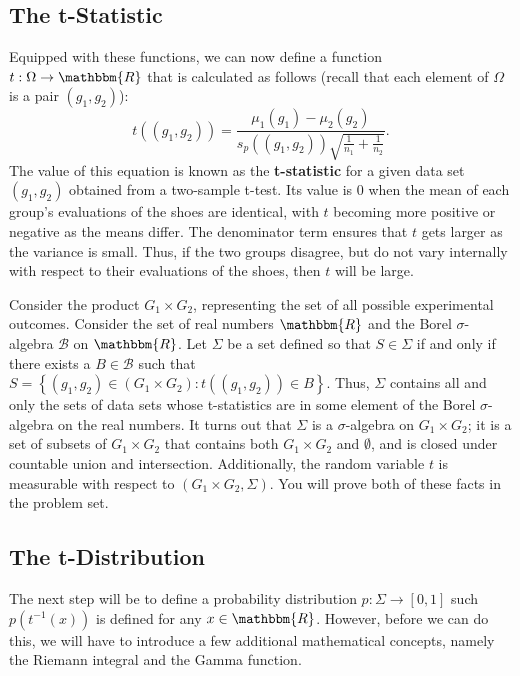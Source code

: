 \documentclass[11pt]{article}
\theoremstyle{definition}
\theoremstyle{remark}
\begin{document}
\subsection{The t-Statistic}\label{subsec:tstat}
Equipped with these functions, we can now define a function $t:\Omega\rightarrow\mathbbm{R}$ that is calculated as follows (recall that each element of $\Omega$ is a pair $(g_{1},g_{2})$): 
$$t((g_{1},g_{2}))=\frac{\mu_{1}(g_{1})-\mu_{2}(g_{2})}{s_{p}((g_{1},g_{2}))\sqrt{\frac{1}{n_{1}}+\frac{1}{n_{2}}}}.$$
The value of this equation is known as the \textbf{t-statistic} for a given data set $(g_{1},g_{2})$ obtained from a two-sample t-test. Its value is $0$ when the mean of each group's evaluations of the shoes are identical, with $t$ becoming more positive or negative as the means differ. The denominator term ensures that $t$ gets larger as the variance is small. Thus, if the two groups disagree, but do not vary internally with respect to their evaluations of the shoes, then $t$ will be large.\par 


Consider the product $G_{1}\times G_{2}$, representing the set of all possible experimental outcomes. Consider the set of real numbers $\mathbbm{R}$ and the Borel $\sigma$-algebra $\mathcal{B}$ on $\mathbbm{R}$. Let $\Sigma$ be a set defined so that $S\in\Sigma$ if and only if there exists a $B\in\mathcal{B}$ such that $S=\left\{(g_{1},g_{2})\in(G_{1}\times G_{2}):t((g_{1},g_{2}))\in B\right\}$. Thus, $\Sigma$ contains all and only the sets of data sets whose t-statistics are in some element of the Borel $\sigma$-algebra on the real numbers. It turns out that $\Sigma$ is a $\sigma$-algebra on $G_{1}\times G_{2}$; it is a set of subsets of $G_{1}\times G_{2}$ that contains both $G_{1}\times G_{2}$ and $\emptyset$, and is closed under countable union and intersection. Additionally, the random variable $t$ is measurable with respect to $(G_{1}\times G_{2},\Sigma)$. You will prove both of these facts in the problem set.


\subsection{The t-Distribution}
The next step will be to define a probability distribution $p:\Sigma\rightarrow[0,1]$ such $p(t^{-1}(x))$ is defined for any $x\in\mathbbm{R}$. However, before we can do this, we will have to introduce a few additional mathematical concepts, namely the Riemann integral and the Gamma function.\par 
\end{document}
